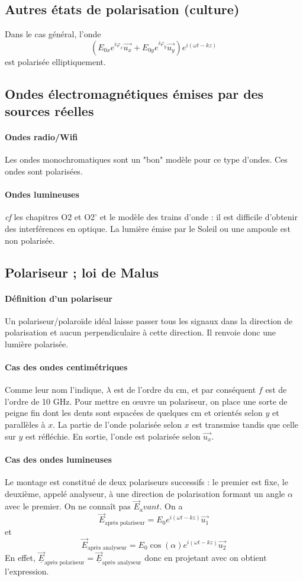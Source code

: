 \documentclass[french]{book}
\theoremstyle{plain}
\theoremstyle{definition}
\theoremstyle{remark}
\begin{document}
\subsection{Autres états de polarisation (culture)}
Dans le cas général, l'onde $$(E_{0x}e^{i\varphi_x}\overrightarrow{u_x}+E_{0y}e^{i\varphi_y}\overrightarrow{u_y})e^{i(\omega t-kz)}$$ est polarisée elliptiquement.
\subsection{Ondes électromagnétiques émises par des sources réelles}
\paragraph{Ondes radio/Wifi} Les ondes monochromatiques sont un "bon" modèle pour ce type d'ondes. Ces ondes sont polarisées.
\paragraph{Ondes lumineuses} \textit{cf} les chapitres O2 et O2' et le modèle des trains d'onde : il est difficile d'obtenir des interférences en optique. La lumière émise par le Soleil ou une ampoule est non polarisée.
\subsection{Polariseur ; loi de Malus}
\paragraph{Définition d'un polariseur} Un polariseur/polaroïde idéal laisse passer tous les signaux dans la direction de polarisation et aucun perpendiculaire à cette direction. Il renvoie donc une lumière polarisée.
\paragraph{Cas des ondes centimétriques} Comme leur nom l'indique, $\lambda$ est de l'ordre du cm, et par conséquent $f$ est de l'ordre de 10 GHz. Pour mettre en œuvre un polariseur, on place une sorte de peigne fin dont les dents sont espacées de quelques cm et orientés selon $y$ et parallèles à $x$. La partie de l'onde polarisée selon $x$ est transmise tandis que celle sur $y$ est réfléchie. En sortie, l'onde est polarisée selon $\overrightarrow{u_x}$. 
\paragraph{Cas des ondes lumineuses} Le montage est constitué de deux polariseurs successifs : le premier est fixe, le deuxième, appelé analyseur, à une direction de polarisation formant un angle $\alpha$ avec le premier. On ne connaît pas $\overrightarrow{E}_avant$. On a $$\overrightarrow{E}_\text{après polariseur}=E_0e^{i(\omega t-kz)}\overrightarrow{u_1}$$ et $$\overrightarrow{E}_{\text{après analyseur}}=E_0\cos(\alpha)e^{i(\omega t-kz)}\overrightarrow{u_2}$$ En effet, $\overrightarrow{\underline{E}}_\text{après polariseur}=\overrightarrow{\underline{E}}_\text{après analyseur}$ donc en projetant avec on obtient l'expression.
\end{document}
